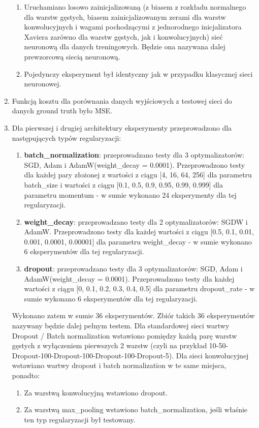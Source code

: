 \documentclass[12pt]{article}
\begin{document}
\begin{enumerate}
\begin{enumerate}
		\item Uruchamiano losowo zainicjalizowaną (z biasem z rozkładu normalnego dla warstw gęstych, biasem zainicjalizowanym zerami dla warstw konwolucyjnych i wagami pochodzącymi z jednorodnego inicjalizatora Xaviera zarówno dla warstw gęstych, jak i konwolucyjnych) sieć neuronową dla danych treningowych. Będzie ona nazywana dalej prewzorcową siecią neuronową.
		\item Pojedynczy eksperyment był identyczny jak w przypadku klasycznej sieci neuronowej.
	\end{enumerate}
	\item Funkcją kosztu dla porównania danych wyjściowych z testowej sieci do danych ground truth było MSE.
	\item Dla pierwszej i drugiej architektury eksperymenty przeprowadzono dla następujących typów regularyzacji:
	\begin{enumerate}
		\item \textbf{batch\_normalization}: przeprowadzano testy dla 3 optymalizatorów: SGD, Adam i AdamW(weight\_decay = 0.0001). Przeprowadzono testy dla każdej pary złożonej z wartości z ciągu [4, 16, 64, 256] dla parametru batch\_size i wartości z ciągu [0.1, 0.5, 0.9, 0.95, 0.99, 0.999] dla parametru momentum - w sumie wykonano 24 eksperymenty dla tej regularyzacji.
		
		\item \textbf{weight\_decay}: przeprowadzano testy dla 2 optymalizatorów: SGDW i AdamW. Przeprowadzono testy dla każdej wartości z ciągu [0.5, 0.1, 0.01, 0.001, 0.0001, 0.00001] dla parametru weight\_decay - w sumie wykonano 6 eksperymentów dla tej regularyzacji.
		
		\item \textbf{dropout}: przeprowadzano testy dla 3 optymalizatorów: SGD, Adam i AdamW(weight\_decay = 0.0001). Przeprowadzono testy dla każdej wartości z ciągu [0, 0.1, 0.2, 0.3, 0.4, 0.5] dla parametru dropout\_rate - w sumie wykonano 6 eksperymentów dla tej regularyzacji.
	\end{enumerate}
	Wykonano zatem w sumie 36 eksperymentów. Zbiór takich 36 eksperymentów nazywany będzie dalej pełnym testem. Dla standardowej sieci wartwy Dropout / Batch normalization wstawiono pomiędzy każdą parę warstw gęstych z wyłączeniem pierwszych 2 warstw (czyli na przykład 10-50-Dropout-100-Dropout-100-Dropout-100-Dropout-5).
	Dla sieci konwolucyjnej wstawiano wartwy dropout i batch normalization w te same miejsca, ponadto:
	\begin{enumerate}
		\item Za warstwą konwolucyjną wstawiono dropout.
		\item Za warstwą max\_pooling wstawiono batch\_normalization, jeśli właśnie ten typ regularyzacji był testowany.
	\end{enumerate}	
	

\end{enumerate}
\end{document}
